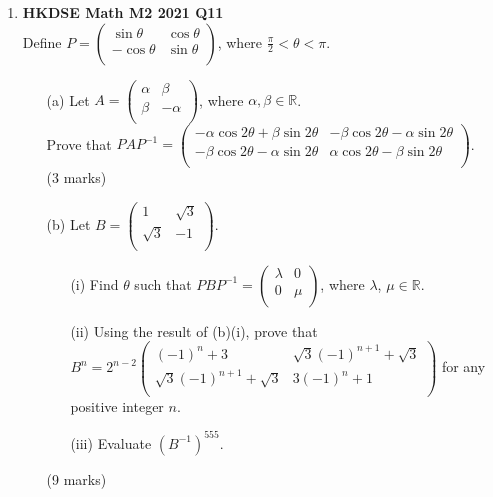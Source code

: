 \documentclass[12pt]{article}
\begin{document}
\begin{enumerate}
	\item \textbf{HKDSE Math M2 2021 Q11}\\
	Define $P = \begin{pmatrix}
		\sin{\theta}&\cos{\theta}\\
		-\cos{\theta}&\sin{\theta}\\
		\end{pmatrix}$, where $\displaystyle \frac{\pi}{2} < \theta < \pi$.
	\begin{enumerate}
		\item [(a)] Let $A = 
			\begin{pmatrix}
			\alpha&\beta\\
			\beta&-\alpha\\
			\end{pmatrix}$, where $\alpha, \beta \in \mathbb{R}$.\\
			Prove that $PAP^{-1} = \begin{pmatrix}
			-\alpha \cos{2\theta}+\beta \sin{2\theta} &-\beta\cos{2\theta}-\alpha \sin{2\theta}\\
			-\beta\cos{2\theta}-\alpha\sin{2\theta}&\alpha\cos{2\theta}-\beta \sin{2\theta}\\
			\end{pmatrix}$. \\(3 marks)
		\item[(b)]Let $B = \begin{pmatrix}
			1&\sqrt{3}\\
			\sqrt{3}&-1\\
			\end{pmatrix}$.
		\begin{enumerate}
			\item [(i)] Find $\theta$ such that $PBP^{-1} = \begin{pmatrix}
				\lambda&0\\
				0&\mu\\
				\end{pmatrix}$, where $\lambda$, $\mu \in \mathbb{R}$.
			\item [(ii)]Using the result of (b)(i), prove that $B^n = 2^{n-2} \begin{pmatrix}
				(-1)^n+3&\sqrt{3}(-1)^{n+1} + \sqrt{3}\\
				\sqrt{3}(-1)^{n+1}+\sqrt{3}&3(-1)^n+1\\
				\end{pmatrix}$
				for any positive integer $n$.
			\item [(iii)] Evaluate $(B^{-1})^{555}$. 
		\end{enumerate}
		(9 marks)
	\end{enumerate}


\end{enumerate}
\end{document}
